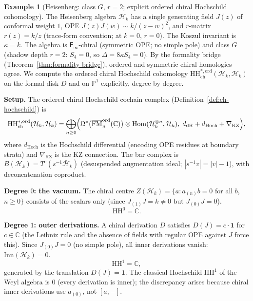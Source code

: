 \documentclass[11pt,reqno]{amsart}
\theoremstyle{definition}
\newtheorem{example}[theorem]{Example}
\theoremstyle{remark}
\newcommand{\cH}{\mathcal{H}}
\newcommand{\HH}{\mathrm{HH}}
\newcommand{\Einf}{\mathsf{E}_{\infty}}
\DeclareMathOperator{\Hom}{Hom}
\DeclareMathOperator{\FM}{FM}
\newcommand{\CC}{\mathbb{C}}
\newcommand{\PP}{\mathbb{P}}
\numberwithin{equation}{section}
\begin{document}
\begin{example}[Heisenberg: class $G$, $r = 2$;
explicit ordered chiral Hochschild cohomology]
\label{ex:heisenberg}
The Heisenberg algebra $\cH_k$ has a single generating
field $J(z)$ of conformal weight $1$, OPE
$J(z)J(w) \sim k/(z-w)^2$, and
$r$-matrix $r(z) = k/z$ (trace-form convention;
at $k=0$, $r = 0$). The Koszul invariant is $\kappa = k$.
The algebra is $\Einf$-chiral (symmetric OPE; no simple
pole) and class $G$ (shadow depth $r=2$: $S_4 = 0$, so
$\Delta = 8\kappa S_4 = 0$).
By the formality bridge (Theorem~\ref{thm:formality-bridge}),
ordered and symmetric chiral homologies agree.
We compute the ordered
chiral Hochschild cohomology
$\HH^{*,\mathrm{ord}}_{\mathrm{ch}}(\cH_k, \cH_k)$ on the
formal disk $D$ and on $\PP^1$ explicitly, degree by degree.

\medskip
\noindent
\textbf{Setup.}
The ordered chiral Hochschild cochain complex
(Definition~\ref{def:ch-hochschild}) is
\[
\HH^{*,\mathrm{ord}}_{\mathrm{ch}}(\cH_k, \cH_k)
= \bigoplus_{n \geq 0}
\Bigl(\Omega^*\bigl(\overline{\FM}_n^{\mathrm{ord}}(\CC)\bigr)
\otimes \Hom(\cH_k^{\otimes n}, \cH_k),\;
d_{\mathrm{dR}} + d_{\mathrm{Hoch}} + \nabla_{\mathrm{KZ}}
\Bigr),
\]
where $d_{\mathrm{Hoch}}$ is the Hochschild differential
(encoding OPE residues at boundary strata) and
$\nabla_{\mathrm{KZ}}$ is the KZ connection.
The bar complex is $B(\cH_k) = T^c(s^{-1}\bar{\cH}_k)$
(desuspended augmentation ideal; $|s^{-1}v| = |v| - 1$),
with deconcatenation coproduct.

\medskip
\noindent
\textbf{Degree $0$: the vacuum.}
The chiral centre $Z(\cH_k) = \{a : a_{(n)}b = 0$
for all $b$, $n \geq 0\}$ consists of the scalars only
(since $J_{(1)}J = k \neq 0$ but $J_{(0)}J = 0$).
\begin{equation}\label{eq:heis-hh0}
\HH^0 = \CC.
\end{equation}

\medskip
\noindent
\textbf{Degree $1$: outer derivations.}
A chiral derivation $D$ satisfies $D(J) = c \cdot \mathbf{1}$
for $c \in \CC$ (the Leibniz rule and the absence of fields
with regular OPE against $J$ force this). Since
$J_{(0)}J = 0$ (no simple pole), all inner derivations vanish:
$\mathrm{Inn}(\cH_k) = 0$.
\begin{equation}\label{eq:heis-hh1}
\HH^1 = \CC,
\end{equation}
generated by the translation $D(J) = \mathbf{1}$.
The classical Hochschild $\mathrm{HH}^1$ of the Weyl algebra
is $0$ (every derivation is inner); the discrepancy arises
because chiral inner derivations use $a_{(0)}$, not
$[a, -]$.


\end{example}
\end{document}
